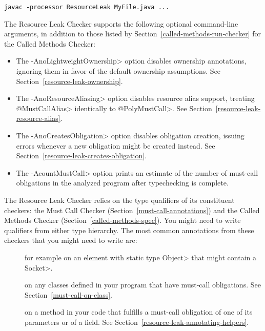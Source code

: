
\begin{Verbatim}
javac -processor ResourceLeak MyFile.java ...
\end{Verbatim}

The Resource Leak Checker supports the following optional command-line arguments,
in addition to those listed by Section~\ref{called-methods-run-checker} for
the Called Methods Checker:
\begin{itemize}
\item The \<-AnoLightweightOwnership> option disables ownership annotations,
 ignoring them in favor of the default ownership assumptions.
 See Section~\ref{resource-leak-ownership}.
\item The \<-AnoResourceAliasing> option disables resource alias support,
 treating \<@MustCallAlias> identically to \<@PolyMustCall>.
 See Section~\ref{resource-leak-resource-alias}.
\item The \<-AnoCreatesObligation> option disables obligation creation,
 issuing errors whenever a new obligation might be created instead.
 See Section~\ref{resource-leak-creates-obligation}.
\item The \<-AcountMustCall> option prints an estimate of the number of
must-call obligations in the analyzed program after typechecking is complete.
\end{itemize}


The Resource Leak Checker relies on the type qualifiers of its constituent checkers:
the Must Call Checker (Section~\ref{must-call-annotations}) and
the Called Methods Checker (Section~\ref{called-methods-spec}). You might need
to write qualifiers from either type hierarchy. The most common annotations from
these checkers that you might need to write are:

\begin{description}

\item[]
for example on an element with static type \<Object> that might contain a \<Socket>.

\item[]
on any classes defined in your program that have must-call obligations. See Section~\ref{must-call-on-class}.

\item[] on a method in
your code that fulfills a must-call obligation of one of its parameters or of a field.
See Section~\ref{resource-leak-annotating-helpers}.

\end{description}

